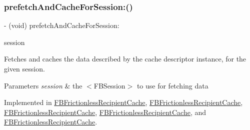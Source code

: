 \mbox{\label{interfaceFBCacheDescriptor_a1d3bbb38753d402a6f08e9402904a8d6}} 
\subsubsection{\texorpdfstring{prefetch\+And\+Cache\+For\+Session\+:()}{prefetchAndCacheForSession:()}\hspace{0.1cm}{\footnotesize\ttfamily [3/5]}}
{\footnotesize\ttfamily -\/ (void) prefetch\+And\+Cache\+For\+Session\+: \begin{DoxyParamCaption}\item[{(\hyperlink{interfaceFBSession}{F\+B\+Session} $\ast$)}]{session }\end{DoxyParamCaption}}

Fetches and caches the data described by the cache descriptor instance, for the given session.


\begin{DoxyParams}{Parameters}
{\em session} & the $<$\+F\+B\+Session$>$ to use for fetching data \\
\hline
\end{DoxyParams}


Implemented in \hyperlink{interfaceFBFrictionlessRecipientCache_a4f218828f2b6a8bb5a8e0044e98689dc}{F\+B\+Frictionless\+Recipient\+Cache}, \hyperlink{interfaceFBFrictionlessRecipientCache_a4f218828f2b6a8bb5a8e0044e98689dc}{F\+B\+Frictionless\+Recipient\+Cache}, \hyperlink{interfaceFBFrictionlessRecipientCache_a4f218828f2b6a8bb5a8e0044e98689dc}{F\+B\+Frictionless\+Recipient\+Cache}, \hyperlink{interfaceFBFrictionlessRecipientCache_a4f218828f2b6a8bb5a8e0044e98689dc}{F\+B\+Frictionless\+Recipient\+Cache}, and \hyperlink{interfaceFBFrictionlessRecipientCache_a4f218828f2b6a8bb5a8e0044e98689dc}{F\+B\+Frictionless\+Recipient\+Cache}.

\mbox{\label{interfaceFBCacheDescriptor_a1d3bbb38753d402a6f08e9402904a8d6}} 
